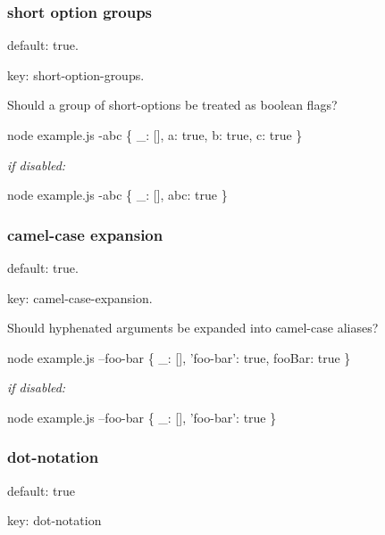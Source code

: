 \subsubsection*{short option groups}


\begin{DoxyItemize}
\item default\+: {\ttfamily true}.
\item key\+: {\ttfamily short-\/option-\/groups}.
\end{DoxyItemize}

Should a group of short-\/options be treated as boolean flags?


\begin{DoxyCode}
node example.js -abc
\{ \_: [], a: true, b: true, c: true \}
\end{DoxyCode}


{\itshape if disabled\+:}


\begin{DoxyCode}
node example.js -abc
\{ \_: [], abc: true \}
\end{DoxyCode}


\subsubsection*{camel-\/case expansion}


\begin{DoxyItemize}
\item default\+: {\ttfamily true}.
\item key\+: {\ttfamily camel-\/case-\/expansion}.
\end{DoxyItemize}

Should hyphenated arguments be expanded into camel-\/case aliases?


\begin{DoxyCode}
node example.js --foo-bar
\{ \_: [], 'foo-bar': true, fooBar: true \}
\end{DoxyCode}


{\itshape if disabled\+:}


\begin{DoxyCode}
node example.js --foo-bar
\{ \_: [], 'foo-bar': true \}
\end{DoxyCode}


\subsubsection*{dot-\/notation}


\begin{DoxyItemize}
\item default\+: {\ttfamily true}
\item key\+: {\ttfamily dot-\/notation}
\end{DoxyItemize}

